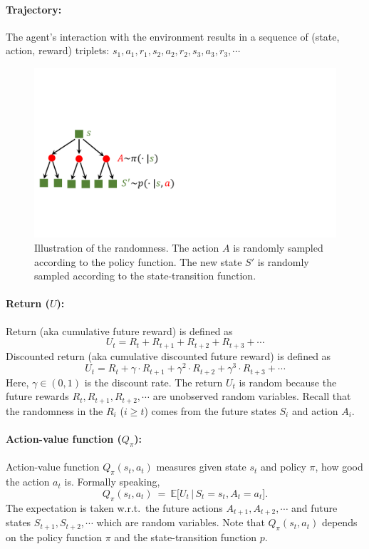 \documentclass[11pt]{article}
\numberwithin{equation}{section}
\def\EB{{\mathbb E}}
\begin{document}
\paragraph{Trajectory:}
The agent's interaction with the environment results in a sequence of (state, action, reward) triplets:
$s_1, a_1, r_1, s_2, a_2, r_2, s_3, a_3, r_3, \cdots$

\begin{figure}[!t]
    \centering
    \includegraphics[width=0.5\linewidth]{figures/randomness.pdf}
    \caption{Illustration of the randomness.
    The action $A$ is randomly sampled according to the policy function.
    The new state $S'$ is randomly sampled according to the state-transition function.
    }
    \label{fig:random}
\end{figure}




\paragraph{Return ($U$):}
Return (aka cumulative future reward) is defined as 
\begin{equation*}
    U_t = R_t + R_{t+1} + R_{t+2} + R_{t+3} + \cdots 
\end{equation*}
Discounted return (aka cumulative discounted future reward) is defined as 
\begin{equation*}
    U_t = R_t + \gamma \cdot R_{t+1} + \gamma^2 \cdot  R_{t+2} + \gamma^3 \cdot  R_{t+3} + \cdots 
\end{equation*}
Here, $\gamma \in (0, 1)$ is the discount rate.
The return $U_t$ is random because the future rewards $R_t, R_{t+1}, R_{t+2}, \cdots $ are unobserved random variables.
Recall that the randomness in the $R_i$ ($i \geq t$) comes from the future states $S_i$ and action $A_{i} $.



\paragraph{Action-value function ($Q_{\pi}$):}
Action-value function $Q_{\pi} (s_t, a_t)$ measures given state $s_t$ and policy $\pi$, how good the action $a_t$ is.
Formally speaking, 
\begin{equation*}
    Q_{\pi} (s_t, a_t)
    \: = \: \EB \big[ U_t \, \big| \, S_t = s_t , A_t = a_t  \big] .
\end{equation*}
The expectation is taken w.r.t.\ the future actions $A_{t+1}, A_{t+2}, \cdots $ and future states $S_{t+1}, S_{t+2}, \cdots $ which are random variables.
Note that $Q_{\pi} (s_t, a_t)$ depends on the policy function $\pi$ and the state-transition function $p$.
\end{document}
